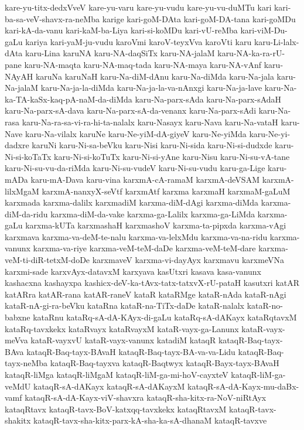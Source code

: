 {kare-yu-titx-dedxVveV
kare-yu-varu
kare-yu-vudu
kare-yu-vu-duMTu
kari
kari-ba-sa-veV-shavx-ra-neMba
karige
kari-goM-DAta
kari-goM-DA-tana
kari-goMDu
kari-kA-da-vanu
kari-kaM-ba-Liya
kari-si-koMDu
kari-vU-reMba
kari-viM-Du-gaLu
kariya
kari-yaM-ju-vudu
karoVmi
karoV-teyxVva
karoVti
karu
karu-Li-lalx-dAta
karu-Lina
karuNA
karu-NA-daqSiTx
karu-NA-jalaM
karu-NA-ka-ra-rU-pane
karu-NA-maqta
karu-NA-maq-tada
karu-NA-maya
karu-NA-vAnf
karu-NAyAH
karuNa
karuNaH
karu-Na-diM-dAnu
karu-Na-diMda
karu-Na-jala
karu-Na-jalaM
karu-Na-ja-la-diMda
karu-Na-ja-la-va-nAnxgi
karu-Na-ja-lave
karu-Na-ka-TA-kaSx-kaq-pA-naM-da-diMda
karu-Na-parx-sAda
karu-Na-parx-sAdaH
karu-Na-parx-sA-dava
karu-Na-parx-sA-da-venanx
karu-Na-parx-sAdi
karu-Na-rasa
karu-Na-ra-sa-vi-ra-hi-ta-nalalx
karu-Nasayx
karu-Nava
karu-Na-vataH
karu-Nave
karu-Na-vilalx
karuNe
karu-Ne-yiM-dA-giyeV
karu-Ne-yiMda
karu-Ne-yi-dadxre
karuNi
karu-Ni-sa-beVku
karu-Nisi
karu-Ni-sida
karu-Ni-si-dudxde
karu-Ni-si-koTaTx
karu-Ni-si-koTuTx
karu-Ni-si-yAne
karu-Nisu
karu-Ni-su-vA-tane
karu-Ni-su-vu-da-riMda
karu-Ni-su-vudeV
karu-Ni-su-vudu
karu-ga-Lige
karu-mADa
karu-mA-Dava
karu-vina
karxmA-cA-ramaM
karxmA-deVSAM
karxmA-lilxMgaM
karxmA-nanxyX-seVtf
karxmAtf
karxma
karxmaH
karxmaM-gaLuM
karxmada
karxma-dalilx
karxmadiM
karxma-diM-dAgi
karxma-diMda
karxma-diM-da-ridu
karxma-diM-da-vake
karxma-ga-Lalilx
karxma-ga-LiMda
karxma-gaLu
karxma-kUTa
karxmashaH
karxmashoV
karxma-ta-pipxda
karxma-vAgi
karxmava
karxma-va-deM-te-nalu
karxma-va-lelxMdu
karxma-va-na-ridu
karxma-vanunx
karxma-va-riye
karxma-veM-teM-daDe
karxma-veM-teM-dare
karxma-veM-ti-diR-tetxM-doDe
karxmaveV
karxma-vi-dayAyx
karxmavu
karxmeVNa
karxmi-sade
karxvAyx-datavxM
karxyava
kasUtxri
kasava
kasa-vanunx
kashacxna
kashayxpa
kashicx-deV-ka-tAvx-tatx-tatxvX-rU-pataH
kasutxri
katAR
katARra
katAR-rana
katAR-raneV
kataR
kataRMge
kataR-nAda
kataR-nAgi
kataR-nA-gi-ra-beVku
kataRna
kataR-na-TiTx-daDe
kataR-nalalx
kataR-no-babxne
kataRnu
kataRq-sA-dA-KAyx-di-gaLu
kataRq-sA-dAKayx
kataRqtavxM
kataRq-tavxkekx
kataRvayx
kataRvayxM
kataR-vayx-ga-Lanunx
kataR-vayx-meVva
kataR-vayxvU
kataR-vayx-vanunx
katadiM
kataqR
kataqR-Baq-tayx-BAva
kataqR-Baq-tayx-BAvaH
kataqR-Baq-tayx-BA-va-va-Lidu
kataqR-Baq-tayx-neMba
kataqR-Baq-tayxva
kataqR-Baqtwyx
kataqR-Bayx-tayx-BAvaH
kataqR-liMga
kataqR-liMgaM
kataqR-liM-ga-mi-hoV-cayxteV
kataqR-liM-ga-veMdU
kataqR-sA-dAKayx
kataqR-sA-dAKayxM
kataqR-sA-dA-Kayx-mu-daBx-vamf
kataqR-sA-dA-Kayx-viV-shavxra
kataqR-sha-kitx-ra-NoV-niRtAyx
kataqRtavx
kataqR-tavx-BoV-katxqq-tavxkekx
kataqRtavxM
kataqR-tavx-shakitx
kataqR-tavx-sha-kitx-parx-kA-sha-ka-sA-dhanaM
kataqR-tavxve
}
